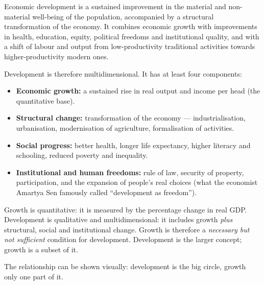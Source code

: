 \documentclass[11pt]{article}
\newcommand{\cle}[1]{{\popxbold\color{popdark}#1}}
\begin{document}
\begin{definition}
\cle{Economic development} is a sustained improvement in the material and non-material well-being of the population, accompanied by a structural transformation of the economy. It combines economic growth with improvements in health, education, equity, political freedoms and institutional quality, and with a shift of labour and output from low-productivity traditional activities towards higher-productivity modern ones.
\end{definition}

Development is therefore \cle{multidimensional}. It has at least four components:
\begin{itemize}
\item \textbf{Economic growth:} a sustained rise in real output and income per head (the quantitative base).
\item \textbf{Structural change:} transformation of the economy — industrialisation, urbanisation, modernisation of agriculture, formalisation of activities.
\item \textbf{Social progress:} better health, longer life expectancy, higher literacy and schooling, reduced poverty and inequality.
\item \textbf{Institutional and human freedoms:} rule of law, security of property, participation, and the expansion of people's real choices (what the economist Amartya Sen famously called ``development as freedom'').
\end{itemize}

\begin{aretenir}
\cle{Growth is quantitative}: it is measured by the percentage change in real GDP. \cle{Development is qualitative and multidimensional}: it includes growth \emph{plus} structural, social and institutional change. Growth is therefore a \emph{necessary but not sufficient} condition for development. Development is the larger concept; growth is a subset of it.
\end{aretenir}

The relationship can be shown visually: development is the big circle, growth only one part of it.
\end{document}
